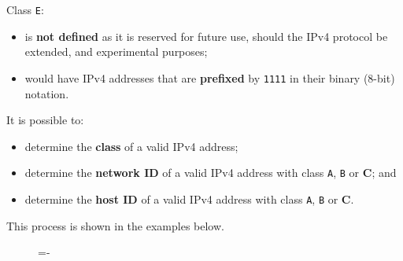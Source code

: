 \documentclass[a4paper]{systems-software}
\begin{document}
Class \texttt{E}:
\begin{itemize}
	\item is \textbf{not defined} as it is reserved for future use, should the IPv4 protocol be extended, and experimental purposes;
	\item would have IPv4 addresses that are \textbf{prefixed} by \texttt{1111} in their binary (8-bit) notation.
\end{itemize}

It is possible to:
\begin{itemize}
	\item determine the \textbf{class} of a valid IPv4 address;
	\item determine the \textbf{network ID} of a valid IPv4 address with class \texttt{A}, \texttt{B} or \textbf{C}; and
	\item determine the \textbf{host ID} of a valid IPv4 address with class \texttt{A}, \texttt{B} or \textbf{C}.
\end{itemize}

This process is shown in the examples below.

\begin{figure}[H]
	\lineskip=-\fboxrule
\end{figure}
\end{document}
